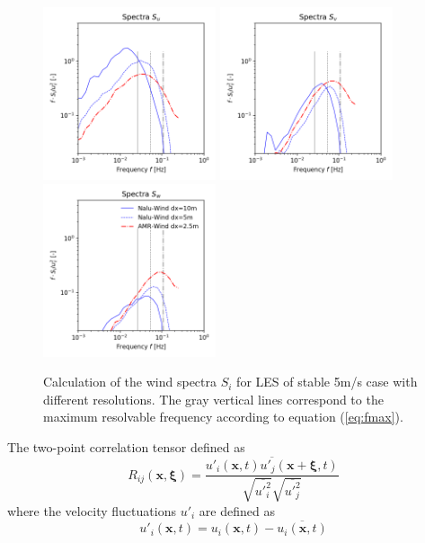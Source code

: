 \begin{figure}[hbt!]
  \label{fig:GridStudySpectra}
  \centering
  \includegraphics[width=2.0in]{figures/GridStudy_Spectra_Su.png}
  \includegraphics[width=2.0in]{figures/GridStudy_Spectra_Sv.png}
  \includegraphics[width=2.0in]{figures/GridStudy_Spectra_Sw.png}
  \caption{Calculation of the wind spectra $S_i$ for LES of stable
    5m/s case with different resolutions.  The gray vertical lines
    correspond to the maximum resolvable frequency according to
    equation (\ref{eq:fmax}). }
\end{figure}

The two-point correlation tensor defined as
\begin{equation}
  \label{eq:Rij}
  R_{ij}({\mathbf x},\boldsymbol{\xi}) = 
  \frac{\overline{ {u'_i(\mathbf{x}, t) u'_j(\mathbf{x}+\boldsymbol{\xi},t)} }}
       { \sqrt{\overline{ u'^2_i }} \sqrt{\overline{ u'^2_j}} }
\end{equation}
where the velocity fluctuations $u'_i$ are defined as 
\begin{equation}
  u'_i(\mathbf{x},t) = u_i(\mathbf{x},t) - \overline{ u_i(\mathbf{x},t) }
\end{equation}

